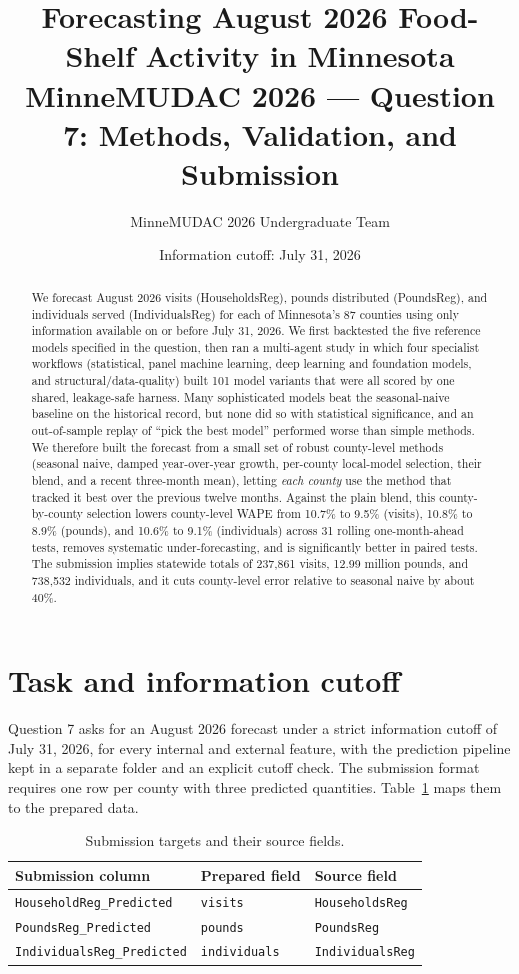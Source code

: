 \documentclass[11pt,letterpaper]{article}
\title{Forecasting August 2026 Food-Shelf Activity in Minnesota\\[2pt]
\large MinneMUDAC 2026 --- Question 7: Methods, Validation, and Submission}
\author{MinneMUDAC 2026 Undergraduate Team}
\date{Information cutoff: July 31, 2026}
\begin{document}
\maketitle
\sloppy

\begin{abstract}
\noindent
We forecast August 2026 visits (HouseholdsReg), pounds distributed (PoundsReg), and
individuals served (IndividualsReg) for each of Minnesota's 87 counties using only information
available on or before July 31, 2026. We first backtested the five reference models specified in the
question, then ran a multi-agent study in which four specialist workflows (statistical, panel
machine learning, deep learning and foundation models, and structural/data-quality) built 101 model
variants that were all scored by one shared, leakage-safe harness. Many sophisticated models beat
the seasonal-naive baseline on the historical record, but none did so with statistical significance,
and an out-of-sample replay of ``pick the best model'' performed worse than simple methods. We
therefore built the forecast from a small set of robust county-level methods (seasonal naive,
damped year-over-year growth, per-county local-model selection, their blend, and a recent
three-month mean), letting \emph{each county} use the method that tracked it best over the
previous twelve months. Against the plain blend, this county-by-county selection lowers county-level
WAPE from 10.7\% to 9.5\% (visits), 10.8\% to 8.9\% (pounds), and 10.6\% to 9.1\% (individuals)
across 31 rolling one-month-ahead tests, removes systematic under-forecasting, and is
significantly better in paired tests. The submission implies statewide totals of 237{,}861 visits,
12.99 million pounds, and 738{,}532 individuals, and it cuts county-level error relative to seasonal
naive by about 40\%.
\end{abstract}

\section{Task and information cutoff}
Question 7 asks for an August 2026 forecast under a strict information cutoff of July 31, 2026, for
every internal and external feature, with the prediction pipeline kept in a separate folder and an
explicit cutoff check. The submission format requires one row per county with three predicted
quantities. Table~\ref{tab:defs} maps them to the prepared data.

\begin{table}[H]\centering\small
\caption{Submission targets and their source fields.}\label{tab:defs}
\begin{tabular}{lll}
\toprule
Submission column & Prepared field & Source field \\
\midrule
\texttt{HouseholdReg\_Predicted} & \texttt{visits} & \texttt{HouseholdsReg} \\
\texttt{PoundsReg\_Predicted} & \texttt{pounds} & \texttt{PoundsReg} \\
\texttt{IndividualsReg\_Predicted} & \texttt{individuals} & \texttt{IndividualsReg} \\
\bottomrule
\end{tabular}
\end{table}
\end{document}
